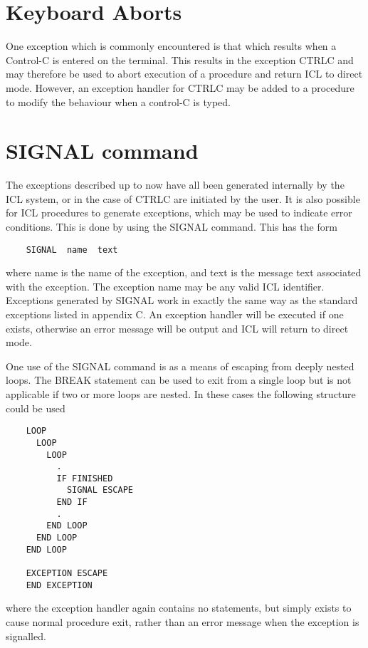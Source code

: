 \documentclass[twoside,11pt]{report}
\newcommand{\xlabel}[1]{}
\begin{document}
\section{\xlabel{keyboard_aborts}Keyboard Aborts}

One exception which is commonly encountered is that which results when
a Control-C is entered on the terminal. This results in the exception
CTRLC and may therefore be used to abort execution of a procedure and
return ICL to direct mode. However, an exception handler for CTRLC may
be added to a procedure to modify the behaviour when a control-C is
typed.

\section{\xlabel{signal_command}SIGNAL command}

The exceptions described up to now have all been generated internally by the
ICL system, or in the case of CTRLC are initiated by the user. It is also
possible for ICL procedures to generate exceptions, which may be used to
indicate error conditions. This is done by using the SIGNAL command. This
has the form
\begin{verbatim}
    SIGNAL  name  text
\end{verbatim}
where name is the name of the exception, and text is the message text
associated with the exception. The exception name may be any valid ICL
identifier. Exceptions generated by SIGNAL work in exactly the same way
as the standard exceptions listed in appendix C. An exception handler
will be executed if one exists, otherwise an error message will be output
and ICL will return to direct mode.

One use of the SIGNAL command is as a means of escaping from deeply nested
loops. The BREAK statement can be used to exit from a single loop but is
not applicable if two or more loops are nested. In these cases the following
structure could be used
\begin{verbatim}
    LOOP
      LOOP
        LOOP
          .
          IF FINISHED
            SIGNAL ESCAPE
          END IF
          .
        END LOOP
      END LOOP
    END LOOP

    EXCEPTION ESCAPE
    END EXCEPTION
\end{verbatim}

where the exception handler again contains no statements, but simply exists
to cause normal procedure exit, rather than an error message when the
exception is signalled.
\end{document}
